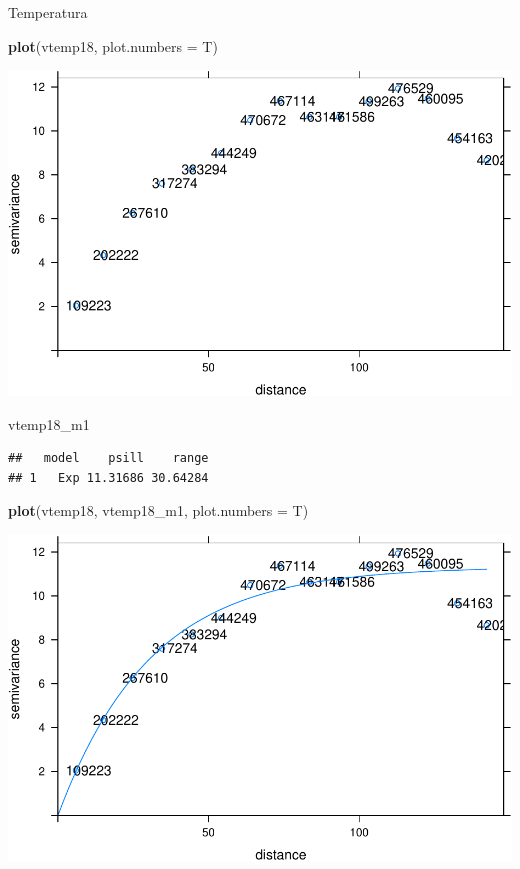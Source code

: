 \documentclass[11pt,]{article}
\newenvironment{Shaded}{\begin{snugshade}}{\end{snugshade}}
\newcommand{\KeywordTok}[1]{\textcolor[rgb]{0.13,0.29,0.53}{\textbf{#1}}}
\newcommand{\DataTypeTok}[1]{\textcolor[rgb]{0.13,0.29,0.53}{#1}}
\newcommand{\NormalTok}[1]{#1}
\begin{document}
Temperatura

\begin{Shaded}
\begin{Highlighting}[]
\KeywordTok{plot}\NormalTok{(vtemp18, }\DataTypeTok{plot.numbers =}\NormalTok{ T)}
\end{Highlighting}
\end{Shaded}

\includegraphics{proyecto_files/figure-latex/unnamed-chunk-40-1.pdf}

\begin{Shaded}
\begin{Highlighting}[]
\NormalTok{vtemp18_m1}
\end{Highlighting}
\end{Shaded}

\begin{verbatim}
##   model    psill    range
## 1   Exp 11.31686 30.64284
\end{verbatim}

\begin{Shaded}
\begin{Highlighting}[]
\KeywordTok{plot}\NormalTok{(vtemp18, vtemp18_m1, }\DataTypeTok{plot.numbers =}\NormalTok{ T)}
\end{Highlighting}
\end{Shaded}

\includegraphics{proyecto_files/figure-latex/unnamed-chunk-40-2.pdf}
\end{document}
